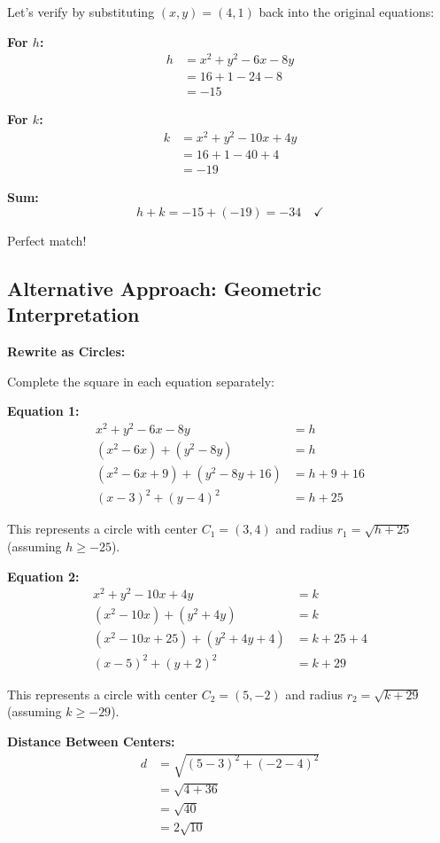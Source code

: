\documentclass[12pt]{article}
\begin{document}
\begin{solutionbox}
Let's verify by substituting $(x, y) = (4, 1)$ back into the original equations:

\textbf{For $h$:}
\begin{align*}
h &= x^2 + y^2 - 6x - 8y\\
&= 16 + 1 - 24 - 8\\
&= -15
\end{align*}

\textbf{For $k$:}
\begin{align*}
k &= x^2 + y^2 - 10x + 4y\\
&= 16 + 1 - 40 + 4\\
&= -19
\end{align*}

\textbf{Sum:}
\[h + k = -15 + (-19) = -34 \quad \checkmark\]

Perfect match!

\subsection*{Alternative Approach: Geometric Interpretation}

\textbf{Rewrite as Circles:}

Complete the square in each equation separately:

\textbf{Equation 1:}
\begin{align*}
x^2 + y^2 - 6x - 8y &= h\\
(x^2 - 6x) + (y^2 - 8y) &= h\\
(x^2 - 6x + 9) + (y^2 - 8y + 16) &= h + 9 + 16\\
(x - 3)^2 + (y - 4)^2 &= h + 25
\end{align*}

This represents a circle with center $C_1 = (3, 4)$ and radius $r_1 = \sqrt{h + 25}$ (assuming $h \geq -25$).

\textbf{Equation 2:}
\begin{align*}
x^2 + y^2 - 10x + 4y &= k\\
(x^2 - 10x) + (y^2 + 4y) &= k\\
(x^2 - 10x + 25) + (y^2 + 4y + 4) &= k + 25 + 4\\
(x - 5)^2 + (y + 2)^2 &= k + 29
\end{align*}

This represents a circle with center $C_2 = (5, -2)$ and radius $r_2 = \sqrt{k + 29}$ (assuming $k \geq -29$).

\textbf{Distance Between Centers:}
\begin{align*}
d &= \sqrt{(5 - 3)^2 + (-2 - 4)^2}\\
&= \sqrt{4 + 36}\\
&= \sqrt{40}\\
&= 2\sqrt{10}
\end{align*}


\end{solutionbox}
\end{document}
